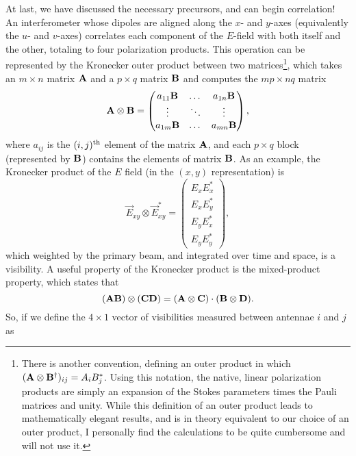 At last, we have discussed the necessary precursors, and can begin correlation! An interferometer whose dipoles are aligned along the $x$- and $y$-axes (equivalently the $u$- and
$v$-axes) correlates each component of the $E$-field with both itself and the other, totaling to
four polarization products. This operation can be represented by the Kronecker outer
product between two
matrices\footnote{There is another convention, defining an outer product in which
$(\mathbf{A}\otimes\mathbf{B}^\dagger)_{ij} = A_iB^*_j$. Using this notation, the native, linear polarization
products are simply an expansion of the Stokes parameters times the Pauli matrices and unity. While
this definition of an outer product leads to mathematically elegant results, and is in theory
equivalent to our choice of an outer product, I personally find the calculations to be quite
cumbersome and will not use it.}, which takes an $m\times n$ matrix $\mathbf{A}$ and a $p\times q$ matrix $\mathbf{B}$ and computes
the $mp\times nq$ matrix
\begin{equation}
  \mathbf{A}\otimes\mathbf{B} = \begin{pmatrix}
      a_{11}\mathbf{B} & \dots & a_{1n}\mathbf{B} \\ 
      \vdots & \ddots & \vdots \\
      a_{1m}\mathbf{B} & \dots & a_{mn}\mathbf{B}
  \end{pmatrix},
\end{equation}
where $a_{ij}$ is the $(i,j)^{{\rm th}}$ element of the matrix $\mathbf{A}$, and each $p\times q$ block
(represented by $\mathbf{B}$) contains the elements of matrix $\mathbf{B}$. As an example, the
Kronecker product of the $E$ field (in the $(x,y)$ representation) is
\begin{equation}
  \vec{E}_{xy}\otimes\vec{E}_{xy}^* = \begin{pmatrix}E_xE_x^*\\E_xE_y^*\\E_yE_x^*\\E_yE_y^*\end{pmatrix},
    \label{eq:example_kronecker}
\end{equation}
which weighted by the primary beam, and integrated over time and space, is a visibility. A useful
property of the Kronecker product is the mixed-product property, which states that
\begin{equation}
  (\mathbf{A}\mathbf{B})\otimes(\mathbf{C}\mathbf{D}) = (\mathbf{A}\otimes\mathbf{C})\cdot(\mathbf{B}\otimes\mathbf{D}).
\end{equation}
So, if we define the $4\times1$ vector of visibilities measured between antennae $i$ and $j$ as 
